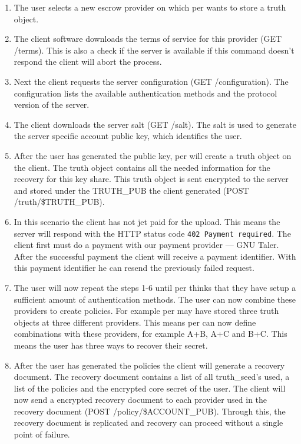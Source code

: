 \begin{enumerate}
\item The user selects a new escrow provider on which per wants to
  store a truth object.
\item The client software downloads the terms of service for this
  provider (GET /terms). This is also a check if the server is
  available if this command doesn't respond the client will abort the
  process.
\item Next the client requests the server configuration (GET
  /configuration). The configuration lists the available
  authentication methods and the protocol version of the server.
\item The client downloads the server salt (GET /salt). The salt is
  used to generate the server specific account public key, which
  identifies the user.
\item After the user has generated the public key, per will create a
  truth object on the client. The truth object contains all the needed
  information for the recovery for this key share. This truth object
  is sent encrypted to the server and stored under the TRUTH\_PUB the client
  generated (POST /truth/\$TRUTH\_PUB).
\item In this scenario the client has not jet paid for the
  upload. This means the server will respond with the HTTP status code
  \texttt{402 Payment required}. The client first must do a payment with our
  payment provider --- GNU Taler. After the successful payment the client
  will receive a payment identifier. With this payment identifier he
  can resend the previously failed request.
\item The user will now repeat the steps 1-6 until per thinks that they
  have setup a sufficient amount of authentication methods. The user
  can now combine these providers to create policies. For example per
  may have stored three truth objects at three different providers.
  This means per can now define combinations with these providers,
  for example A+B, A+C and B+C. This means the user has three ways to
  recover their secret.
\item After the user has generated the policies the client will
  generate a recovery document. The recovery document contains a list
  of all truth\_seed's used, a list of the policies and the encrypted core
  secret of the user. The client will now send a encrypted recovery
  document to each provider used in the recovery document (POST
  /policy/\$ACCOUNT\_PUB). Through this, the recovery document is
  replicated and recovery can proceed without a single point of
  failure.
\end{enumerate}
\newpage
